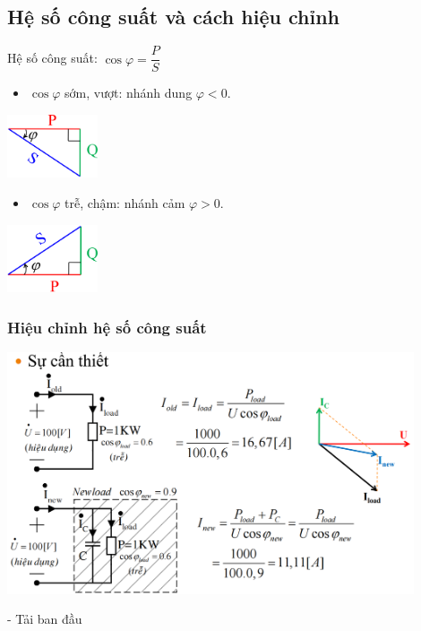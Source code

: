 \subsection{Hệ số công suất và cách hiệu chỉnh}
Hệ số công suất: $\cos \varphi = \dfrac{P}{S}$
\begin{itemize}
    \item $\cos \varphi$ sớm, vượt: nhánh dung $\varphi < 0$.
\end{itemize}
\begin{center}
    \includegraphics[width = 0.2\textwidth]{./image/54.png}
\end{center}
\begin{itemize}
    \item $\cos \varphi$ trễ, chậm: nhánh cảm $\varphi > 0$.
\end{itemize}
\begin{center}
    \includegraphics[width = 0.2\textwidth]{./image/55.png}
\end{center}
\subsubsection{Hiệu chỉnh hệ số công suất}
\begin{center}
    \includegraphics[width = 0.9\textwidth]{./image/56.png}
\end{center}
- Tải ban đầu

